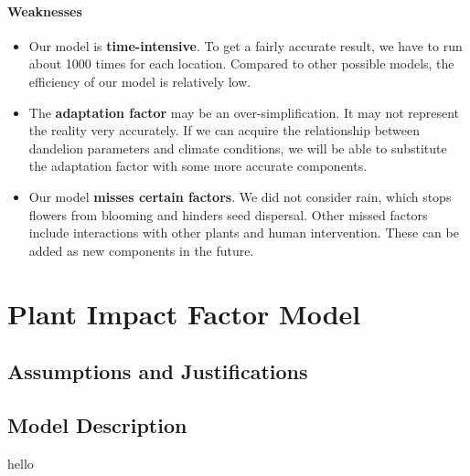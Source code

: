 \documentclass[12pt]{article}
\begin{document}
			\paragraph{Weaknesses}
			\vspace{-0.5cm}
			\begin{itemize}
				\vspace{-0.3cm}
				\item Our model is \textbf{time-intensive}.  To get a fairly accurate result, we have to run about 1000 times for each location.  Compared to other possible models, the efficiency of our model is relatively low.
				
				\vspace{-0.3cm}
				\item The \textbf{adaptation factor} may be an over-simplification.  It may not represent the reality very accurately.  If we can acquire the relationship between dandelion parameters and climate conditions, we will be able to substitute the adaptation factor with some more accurate components.
				
				\vspace{-0.3cm}
				\item Our model \textbf{misses certain factors}.  We did not consider rain, which stops flowers from blooming and hinders seed dispersal.  Other missed factors include interactions with other plants and human intervention.  These can be added as new components in the future.
				
			\end{itemize}

		
		
		
		
\section{Plant Impact Factor Model}

	\subsection{Assumptions and Justifications}
	
	\subsection{Model Description}

		hello
		
\end{document}

